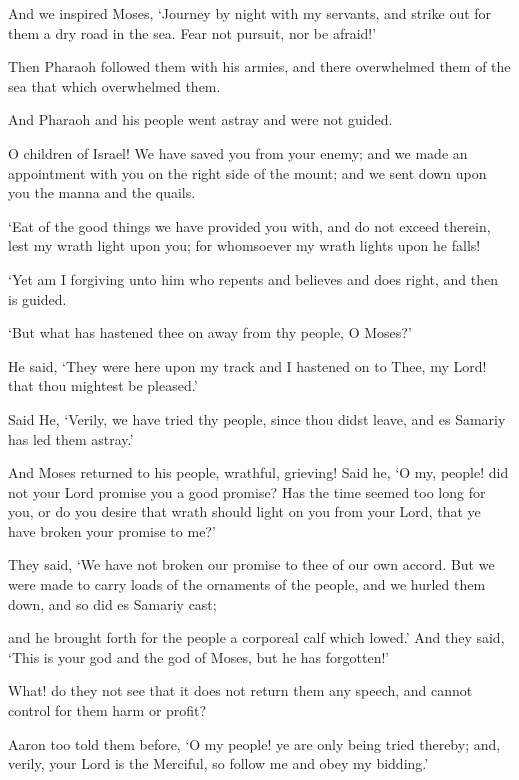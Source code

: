 \documentclass[fontsize=14pt, letterpaper, notitlepage, openany, DIV=12]{scrbook} %
\begin{document}
\noindent[20:77]
And we inspired Moses, `Journey by night with my servants, and strike out for them a dry
road in the sea. Fear not pursuit, nor be afraid!'

\noindent[20:78]
Then Pharaoh followed them with his armies, and there overwhelmed them of the sea that
which overwhelmed them.

\noindent[20:79]
And Pharaoh and his people went astray and were not guided.

\noindent[20:80]
O children of Israel! We have saved you from your enemy; and we made an appointment
with you on the right side of the mount; and we sent down upon you the manna and the quails.

\noindent[20:81]
`Eat of the good things we have provided you with, and do not exceed therein, lest my
wrath light upon you; for whomsoever my wrath lights upon he falls!

\noindent[20:82]
`Yet am I forgiving unto him who repents and believes and does right, and then is guided.

\noindent[20:83]
`But what has hastened thee on away from thy people, O Moses?'

\noindent[20:84]
He said, `They were here upon my track and I hastened on to Thee, my Lord! that thou
mightest be pleased.'

\noindent[20:85]
Said He, `Verily, we have tried thy people, since thou didst leave, and es Samariy has led
them astray.'

\noindent[20:86]
And Moses returned to his people, wrathful, grieving! Said he, `O my, people! did not
your Lord promise you a good promise? Has the time seemed too long for you, or do you desire
that wrath should light on you from your Lord, that ye have broken your promise to me?'

\noindent[20:87]
They said, `We have not broken our promise to thee of our own accord. But we were
made to carry loads of the ornaments of the people, and we hurled them down, and so did es
Samariy cast;

\noindent[20:88]
and he brought forth for the people a corporeal calf which lowed.' And they said, `This is
your god and the god of Moses, but he has forgotten!'

\noindent[20:89]
What! do they not see that it does not return them any speech, and cannot control for
them harm or profit?

\noindent[20:90]
Aaron too told them before, `O my people! ye are only being tried thereby; and, verily,
your Lord is the Merciful, so follow me and obey my bidding.'
\end{document}
